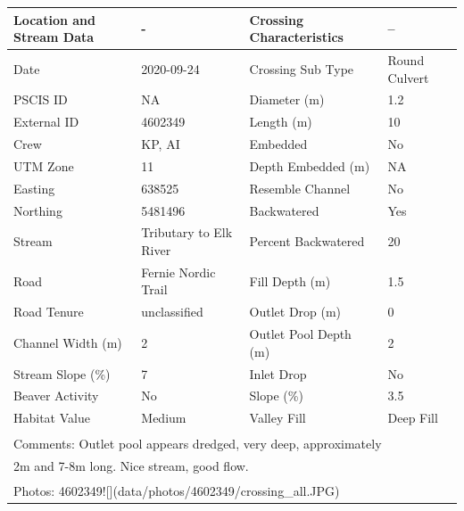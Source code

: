 \documentclass[
]{book}
\begin{document}
\begin{tabular}{llll}
\toprule
Location and Stream Data & - & Crossing Characteristics & --\\
\midrule
Date & 2020-09-24 & Crossing Sub Type & Round Culvert\\
PSCIS ID & NA & Diameter (m) & 1.2\\
External ID & 4602349 & Length (m) & 10\\
Crew & KP, AI & Embedded & No\\
UTM Zone & 11 & Depth Embedded (m) & NA\\
\addlinespace
Easting & 638525 & Resemble Channel & No\\
Northing & 5481496 & Backwatered & Yes\\
Stream & Tributary to Elk River & Percent Backwatered & 20\\
Road & Fernie Nordic Trail & Fill Depth (m) & 1.5\\
Road Tenure & unclassified & Outlet Drop (m) & 0\\
\addlinespace
Channel Width (m) & 2 & Outlet Pool Depth (m) & 2\\
Stream Slope (\%) & 7 & Inlet Drop & No\\
Beaver Activity & No & Slope (\%) & 3.5\\
Habitat Value & Medium & Valley Fill & Deep Fill\\
\bottomrule
\multicolumn{4}{l}{\textsuperscript{} Comments: Outlet pool appears dredged, very deep, approximately}\\
\multicolumn{4}{l}{2m and 7-8m long. Nice stream, good flow.}\\
\multicolumn{4}{l}{\textsuperscript{} Photos: 4602349![](data/photos/4602349/crossing\_all.JPG)}\\
\end{tabular}
\end{document}
